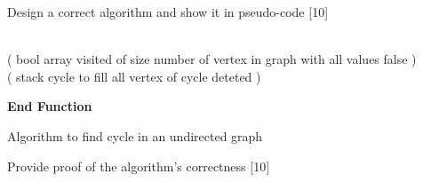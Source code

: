 \documentclass[12pt,letterpaper, onecolumn]{exam}
\begin{document}
\begin{questions}

    \question Design a correct algorithm and show it in pseudo-code [10]\droppoints
    
    \begin{solution}
    \\
        ( bool array visited of size number of vertex in graph with all values false )\\
        ( stack cycle to fill all vertex of cycle deteted )\\
        
        \begin{algorithm}[H]
        \textbf{End Function}
        \caption{Algorithm to find cycle in an undirected graph}
        \label{FindCycleAlgo} 
        \end{algorithm}
    \end{solution}
    \pagebreak %
    \question Provide proof of the algorithm's correctness [10]
    
    \begin{solution}
        \\
        \begin{parts}
        

\end{parts}
\end{solution}
\end{questions}
\end{document}
